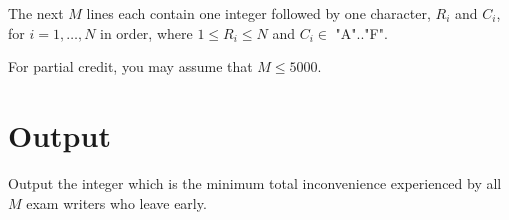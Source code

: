 The next $M$ lines each contain one integer followed by one character, $R_i$ and $C_i$, for $i =
1, \ldots, N$ in order, where $1 \leq R_i \leq N$ and $C_i \in$ "A".."F".

For partial credit, you may assume that $M \leq 5000$.

\section*{Output}
Output the integer which is the minimum total inconvenience experienced by all $M$ exam writers who
leave early.
